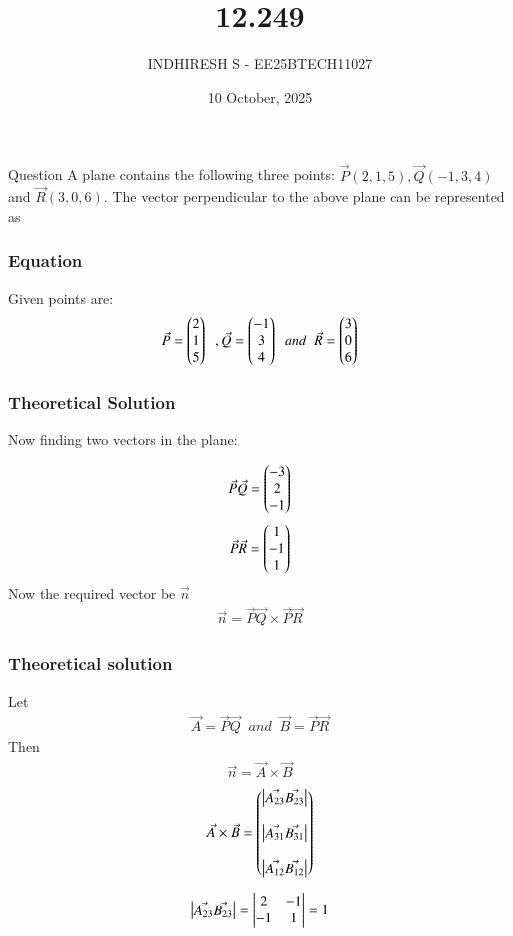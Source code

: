 \documentclass{beamer}
\title %
    {12.249}
\date{10 October, 2025}
\author %
    {INDHIRESH S - EE25BTECH11027}
\begin{document}
    
    \frame{\titlepage}
    
    \begin{frame}{Question}
  A plane contains the following three points: $\Vec{P}(2, 1, 5), \Vec{Q}(-1, 3, 4)$ and $\Vec{R}(3, 0, 6)$. The vector perpendicular to the above plane can be represented as
    \end{frame}
    
    \begin{frame}[allowframebreaks] 
    \frametitle{Equation}
        \centering
        \label{tab:parameters}
Given points are:
\begin{align}
 \Vec{P}=\begin{pmatrix}2\\1\\5\end{pmatrix}\;\;,\Vec{Q}=\begin{pmatrix}-1\\3\\4\end{pmatrix}\;\;and\;\;\Vec{R}=\begin{pmatrix}3\\0\\6\end{pmatrix}
\end{align}
    \end{frame}
    
    \begin{frame}
    \frametitle{Theoretical Solution}
   Now finding two vectors in the plane:

\begin{align}
 \Vec{P}\Vec{Q}=\begin{pmatrix}-3\\2\\-1\end{pmatrix}
\end{align}
\begin{align}
\Vec{P}\Vec{R}=\begin{pmatrix}1\\-1\\1\end{pmatrix}
\end{align}
Now the required vector be $\Vec{n}$
\begin{align}
\Vec{n}=\Vec{P}\Vec{Q}\times\Vec{P}\Vec{R}
\end{align}




    \end{frame}
    
    \begin{frame}
    \frametitle{Theoretical solution}
Let
\begin{align}
    \Vec{A}=\Vec{P}\Vec{Q}\;\;and\;\;\Vec{B}=\Vec{P}\Vec{R}
\end{align}
Then
\begin{align}
    \Vec{n}=\Vec{A}\times\Vec{B}
\end{align}
\begin{align}
\Vec{A}\times\Vec{B}=\begin{pmatrix}\begin{vmatrix}\Vec{A_{23}}\Vec{B_{23}}\end{vmatrix}\\\\\begin{vmatrix}\Vec{A_{31}} \Vec{B_{31}}\end{vmatrix}\\\\\begin{vmatrix}\Vec{A_{12}} \Vec{B_{12}}\end{vmatrix}\end{pmatrix}
\end{align}

\begin{align}
 \begin{vmatrix}\Vec{A_{23}}\Vec{B_{23}}\end{vmatrix}=\begin{vmatrix}2&-1\\-1&1\end{vmatrix}=1
\end{align}





    \end{frame}
\end{document}
